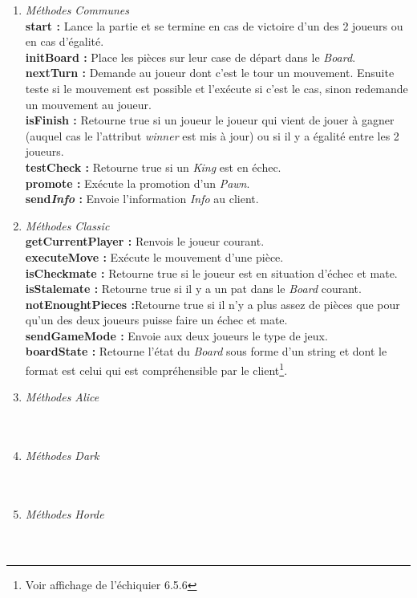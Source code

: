 \documentclass[10pt, a4paper]{article}
\begin{document}
\begin{enumerate}

\item \textit{Méthodes Communes} \\
\textbf{start :} Lance la partie et se termine en cas de victoire d'un des 2 joueurs ou en cas d'égalité. \\
\textbf{initBoard :} Place les pièces sur leur case de départ dans le \textit{Board}. \\
\textbf{nextTurn :} Demande au joueur dont c'est le tour un mouvement. Ensuite teste si le mouvement est possible et l'exécute si c'est le cas, sinon redemande un mouvement au joueur. \\
\textbf{isFinish :} Retourne true si un joueur le joueur qui vient de jouer à gagner (auquel cas le l'attribut \textit{winner} est mis à jour) ou si il y a égalité entre les 2 joueurs. \\
\textbf{testCheck :} Retourne true si un \textit{King} est en échec. \\
\textbf{promote :} Exécute la promotion d'un \textit{Pawn}.\\
\textbf{send\textsl{Info} :} Envoie l'information \textsl{Info} au client.\\

\item \textit{Méthodes Classic } \\
\textbf{getCurrentPlayer :} Renvois le joueur courant.\\
\textbf{executeMove :} Exécute le mouvement d'une pièce.\\
\textbf{isCheckmate :} Retourne true si le joueur est en situation d'échec et mate.\\
\textbf{isStalemate :} Retourne true si il y a un pat dans le \textit{Board} courant.\\
\textbf{notEnoughtPieces :}Retourne true si il n'y a plus assez de pièces que pour qu'un des deux joueurs puisse faire un échec et mate.\\
\textbf{sendGameMode :} Envoie aux deux joueurs le type de jeux.\\
\textbf{boardState :} Retourne l'état du \textit{Board} sous forme d'un string et dont le format est celui qui est compréhensible par le client\footnote{Voir affichage de l'échiquier 6.5.6}.\\

\item \textit{Méthodes Alice} \\
\textbf{}  \\
\textbf{}  \\

\item \textit{Méthodes Dark} \\
\textbf{}  \\
\textbf{}  \\

\item \textit{Méthodes Horde} \\
\textbf{}  \\
\textbf{}  \\
\end{enumerate}
\end{document}
